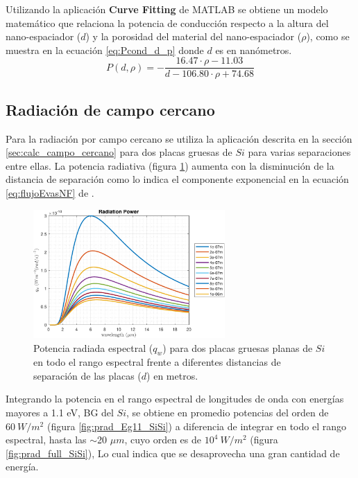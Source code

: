 Utilizando la aplicación \textbf{Curve Fitting} de MATLAB se obtiene un modelo matemático que relaciona la potencia de conducción respecto a la altura del nano-espaciador ($d$) y la porosidad del material del nano-espaciador ($\rho$), como se muestra en la ecuación \eqref{eq:Pcond_d_p} donde $d$ es en nanómetros.
\begin{equation}
P(d,\rho)=- \frac{  16.47\cdot \rho-11.03 }{d-106.80\cdot \rho +74.68}
\label{eq:Pcond_d_p}
\end{equation}\vspace{2cm}
\subsection{Radiación de campo cercano}
Para la radiación por campo cercano se utiliza la aplicación descrita en la sección \ref{sec:calc_campo_cercano} para dos placas gruesas de $Si$ para varias separaciones entre ellas. La potencia radiativa (figura \ref{fig:rad_SiSi_ds}) aumenta con la disminución de la distancia de separación como lo indica el componente exponencial en la ecuación \eqref{eq:flujoEvasNF} de \cite{nfTPV_equations}.
\begin{figure}[H]
	\centering
		\includegraphics[width=0.65\textwidth]{figuras/Resultados/radiacion/SiSi_ds.pdf}
	\caption{Potencia radiada espectral ($q_w$) para dos placas gruesas planas de $Si$ en todo el rango espectral frente a diferentes distancias de separación de las placas ($d$) en metros.\sourceSpectralRadiation}
	\label{fig:rad_SiSi_ds}
\end{figure}
Integrando la potencia en el rango espectral de longitudes de onda con energías mayores a 1.1 eV, BG del $Si$, se obtiene en promedio potencias del orden de $60 \ W/m^2$ (figura \ref{fig:prad_Eg11_SiSi}) a diferencia de integrar en todo el rango espectral, hasta las $\sim$20 $\mu m$, cuyo orden es de $10^4 \ W/m^2$ (figura \ref{fig:prad_full_SiSi}), Lo cual indica que se desaprovecha una gran cantidad de energía.
